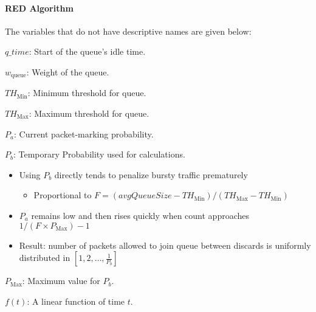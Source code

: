 \paragraph{RED Algorithm}\label{par:Random_Early_Discard_Algorithm}
The variables that do not have descriptive names are given below:
\begin{description}[noitemsep]
\item $q\_time$: Start of the queue's idle time.
\item $w_{\mathrm{queue}}$: Weight of the queue.
\item $TH_{\mathrm{Min}}$: Minimum threshold for queue.
\item $TH_{\mathrm{Max}}$: Maximum threshold for queue.
\item $P_{a}$: Current packet-marking probability.
\item $P_{b}$: Temporary Probability used for calculations.
  \begin{itemize}[noitemsep]
  \item Using $P_{b}$ directly tends to penalize bursty traffic prematurely
    \begin{itemize}[noitemsep]
    \item Proportional to $F=(avgQueueSize-TH_{\mathrm{Min}})/(TH_{\mathrm{Max}}-TH_{\mathrm{Min}})$
    \end{itemize}
\item $P_{a}$ remains low and then rises quickly when count approaches $1/(F \times P_{\mathrm{Max}})-1$
\item Result: number of packets allowed to join queue between discards is uniformly distributed in $\left[1, 2, \ldots, \frac{1}{P_{b}} \right]$
  \end{itemize}
\item $P_{\mathrm{Max}}$: Maximum value for $P_{b}$.
\item $f(t)$: A linear function of time $t$.
\end{description}


